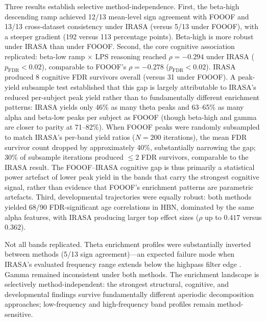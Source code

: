 Three results establish selective method-independence. First, the beta-high descending ramp achieved 12/13 mean-level sign agreement with FOOOF and 13/13 cross-dataset consistency under IRASA (versus 5/13 under FOOOF), with a steeper gradient (192 versus 113 percentage points). Beta-high is more robust under IRASA than under FOOOF. Second, the core cognitive association replicated: beta-low ramp $\times$ LPS reasoning reached $\rho = -0.294$ under IRASA ($p_\text{FDR} < 0.02$), comparable to FOOOF's $\rho = -0.278$ ($p_\text{FDR} < 0.02$). IRASA produced 8 cognitive FDR survivors overall (versus 31 under FOOOF). A peak-yield subsample test established that this gap is largely attributable to IRASA's reduced per-subject peak yield rather than to fundamentally different enrichment patterns: IRASA yields only 46\% as many theta peaks and 63--65\% as many alpha and beta-low peaks per subject as FOOOF (though beta-high and gamma are closer to parity at 71--82\%). When FOOOF peaks were randomly subsampled to match IRASA's per-band yield ratios ($N = 200$ iterations), the mean FDR survivor count dropped by approximately 40\%, substantially narrowing the gap; 30\% of subsample iterations produced $\leq$2 FDR survivors, comparable to the IRASA result. The FOOOF--IRASA cognitive gap is thus primarily a statistical power artefact of lower peak yield in the bands that carry the strongest cognitive signal, rather than evidence that FOOOF's enrichment patterns are parametric artefacts. Third, developmental trajectories were equally robust: both methods yielded 68/90 FDR-significant age correlations in HBN, dominated by the same alpha features, with IRASA producing larger top effect sizes ($\rho$ up to $0.417$ versus $0.362$).

Not all bands replicated. Theta enrichment profiles were substantially inverted between methods (5/13 sign agreement)---an expected failure mode when IRASA's evaluated frequency range extends below the highpass filter edge \parencite{gerster2022irasa}. Gamma remained inconsistent under both methods. The enrichment landscape is selectively method-independent: the strongest structural, cognitive, and developmental findings survive fundamentally different aperiodic decomposition approaches; low-frequency and high-frequency band profiles remain method-sensitive.
